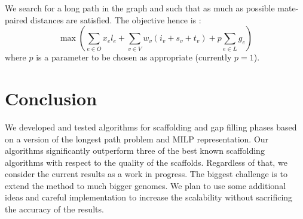 \documentclass{endmH}
\newcommand{\forLaterVersions}[1]{}
\begin{document}
We search for a long path in the graph and such that as much as possible  mate-paired distances  are satisfied. The objective hence is : 
%
 \begin{equation}\label{all_coeff}
 \max \left( \sum_{e\in O} x_e l_e  +   \sum_{v\in V} w_v ( i_v+ s_v + t_v ) + p \sum_{e\in L} g_e   \right)
\end{equation}
where $p$ is a parameter to be chosen as appropriate (currently $p=1$). 

\forLaterVersions{\smallskip\textbf{Remark:} Note that omitting constraints  (\ref{one_paths}) %
from the above model generates a set of paths that cover  "optimally" the contig graph, rather than a single path.  We have tested this variant of the model, but the obtained solutions were too much fragmented and of worse  quality compared to the single-path model.}



 \section{Conclusion}
 
 We developed and tested  algorithms for scaffolding  and gap filling phases based on a version of the longest path problem and MILP representation. Our algorithms significantly outperform three of the best known scaffolding algorithms with respect to the quality of the scaffolds. Regardless of that, we consider the current results as a work in progress. The biggest challenge is to extend the method to much bigger genomes. We plan to use some additional ideas and careful implementation to increase the scalability \forLaterVersions{of the methods} without sacrificing the accuracy of the results.            


 


\end{document}
